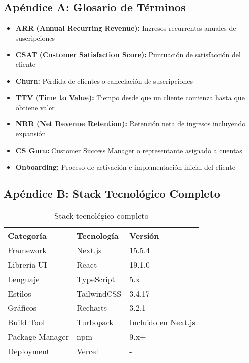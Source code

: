 \documentclass[12pt,a4paper]{article}
\begin{document}
\subsection{Apéndice A: Glosario de Términos}

\begin{itemize}
    \item \textbf{ARR (Annual Recurring Revenue):} Ingresos recurrentes anuales de suscripciones
    \item \textbf{CSAT (Customer Satisfaction Score):} Puntuación de satisfacción del cliente
    \item \textbf{Churn:} Pérdida de clientes o cancelación de suscripciones
    \item \textbf{TTV (Time to Value):} Tiempo desde que un cliente comienza hasta que obtiene valor
    \item \textbf{NRR (Net Revenue Retention):} Retención neta de ingresos incluyendo expansión
    \item \textbf{CS Guru:} Customer Success Manager o representante asignado a cuentas
    \item \textbf{Onboarding:} Proceso de activación e implementación inicial del cliente
\end{itemize}

\subsection{Apéndice B: Stack Tecnológico Completo}

\begin{table}[h]
\centering
\small
\begin{tabular}{|l|l|l|}
\hline
\textbf{Categoría} & \textbf{Tecnología} & \textbf{Versión} \\
\hline
Framework & Next.js & 15.5.4 \\
Librería UI & React & 19.1.0 \\
Lenguaje & TypeScript & 5.x \\
Estilos & TailwindCSS & 3.4.17 \\
Gráficos & Recharts & 3.2.1 \\
Build Tool & Turbopack & Incluido en Next.js \\
Package Manager & npm & 9.x+ \\
Deployment & Vercel & - \\
\hline
\end{tabular}
\caption{Stack tecnológico completo}
\end{table}
\end{document}
